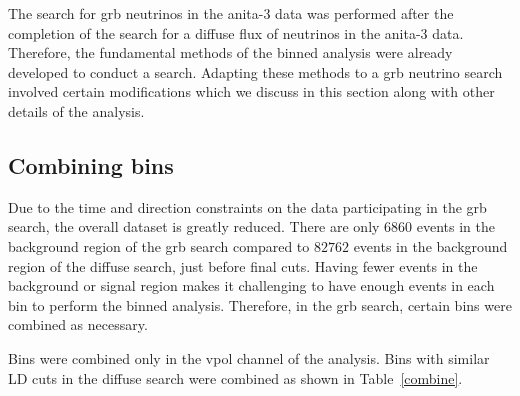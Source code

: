 The search for \gls{grb} neutrinos in the \gls{anita}-3 data was performed after the completion of the search for a diffuse flux of neutrinos in the \gls{anita}-3 data. Therefore, the fundamental methods of the binned analysis were already developed to conduct a search. Adapting these methods to a \gls{grb} neutrino search involved certain modifications which we discuss in this section along with other details of the analysis.

\subsection{Combining bins}

Due to the time and direction constraints on the data participating in the \gls{grb} search, the overall dataset is greatly reduced. There are only $6860$ events in the background region of the \gls{grb} search compared to $82762$ events in the background region of the diffuse search, just before final cuts. Having fewer events in the background or signal region makes it challenging to have enough events in each bin to perform the binned analysis. Therefore, in the \gls{grb} search, certain bins were combined as necessary. 

Bins were combined only in the \gls{vpol} channel of the analysis. Bins with similar LD cuts in the diffuse search were combined as shown in Table~\ref{combine}. 


